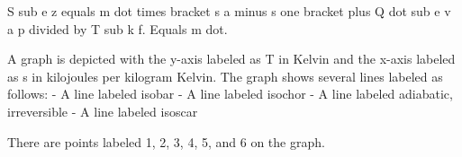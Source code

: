 S sub e z equals m dot times bracket s a minus s one bracket plus Q dot sub e v a p divided by T sub k f.  
Equals m dot.

A graph is depicted with the y-axis labeled as T in Kelvin and the x-axis labeled as s in kilojoules per kilogram Kelvin. The graph shows several lines labeled as follows:
- A line labeled isobar
- A line labeled isochor
- A line labeled adiabatic, irreversible
- A line labeled isoscar

There are points labeled 1, 2, 3, 4, 5, and 6 on the graph.